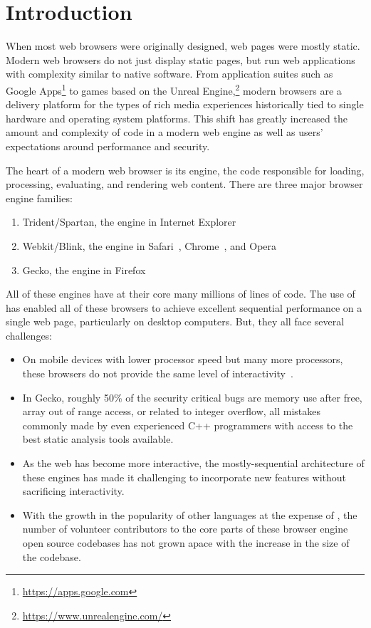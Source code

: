 \section{Introduction}
\label{sec:intro}
When most web browsers were originally designed, web pages were mostly static.
Modern web browsers do not just display static pages, but run web applications
with complexity similar to native software.
From application suites such as Google Apps\footnote{\url{https://apps.google.com}} to games
based on the Unreal Engine,\footnote{\url{https://www.unrealengine.com/}}
modern browsers are a delivery platform for the types of rich media experiences historically
tied to single hardware and operating system platforms.
This shift has greatly increased the amount and complexity of code in a modern web engine
as well as users' expectations around performance and security.

The heart of a modern web browser is its engine, the code responsible
for loading, processing, evaluating, and rendering web content.
There are three major browser engine families:
\begin{enumerate}
\item Trident/Spartan, the engine in Internet Explorer~\cite{IE}
\item Webkit\cite{WEBKIT}/Blink, the engine in Safari~\cite{SAFARI}, Chrome~\cite{CHROME}, and Opera~\cite{OPERA}
\item Gecko, the engine in Firefox~\cite{FIREFOX}
\end{enumerate}
All of these engines have at their core many millions of lines of \Cplusplus{} code.
The use of \Cplusplus{} has enabled all of these browsers to achieve excellent sequential
performance on a single web page, particularly on desktop computers.
But, they all face several challenges:
\begin{itemize}
  \item On mobile devices with lower processor speed but many more processors, these browsers
    do not provide the same level of interactivity~\cite{parallelizing-web-pages,ZOOMM}.
  \item In Gecko, roughly 50\% of the security critical bugs are memory use after free, array
    out of range access, or related to integer overflow, all mistakes commonly made by even
    experienced C++ programmers with access to the best static analysis tools available.
  \item As the web has become more interactive, the mostly-sequential architecture of these engines
    has made it challenging to incorporate new features without sacrificing interactivity.
  \item With the growth in the popularity of other languages at the expense of \Cplusplus{}, 
    the number of volunteer contributors to the core \Cplusplus{} parts of these browser engine
    open source codebases has not grown apace with the increase in the size
    of the codebase.
\end{itemize}

